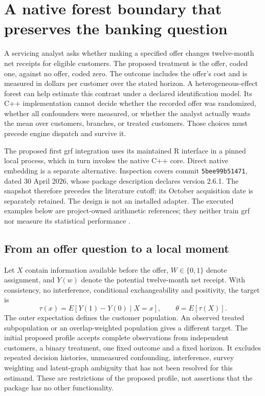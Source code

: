\section{A native forest boundary that preserves the banking question}
\label{exec13:grf-adapter}

A servicing analyst asks whether making a specified offer changes
twelve-month net receipts for eligible customers. The proposed treatment
is the offer, coded one, against no offer, coded zero. The outcome
includes the offer's cost and is measured in dollars per customer over
the stated horizon. A heterogeneous-effect forest can help estimate this
contrast under a declared identification model. Its C++ implementation
cannot decide whether the recorded offer was randomized, whether all
confounders were measured, or whether the analyst actually wants the
mean over customers, branches, or treated customers. Those choices must
precede engine dispatch and survive it.

The proposed first grf integration uses its maintained R interface in a
pinned local process, which in turn invokes the native C++ core. Direct
native embedding is a separate alternative. Inspection covers commit
\texttt{5bee99b51471}, dated 30 April 2026, whose package description
declares version 2.6.1. The snapshot therefore precedes the literature
cutoff; its October acquisition date is separately retained. The design
is not an installed adapter. The executed examples below are
project-owned arithmetic references; they neither train grf nor measure
its statistical performance
\citep{exec13_grf_runtime,exec13_grf_design,exec13_grf_oracle}.

\subsection{From an offer question to a local moment}

Let \(X\) contain information available before the offer,
\(W\in\{0,1\}\) denote assignment, and \(Y(w)\) denote the potential
twelve-month net receipt. With consistency, no interference, conditional
exchangeability and positivity, the target is \[
 \tau(x)=E[Y(1)-Y(0)\mid X=x],\qquad
 \theta=E[\tau(X)].
\] The outer expectation defines the customer population. An observed
treated subpopulation or an overlap-weighted population gives a
different target. The initial proposed profile accepts complete
observations from independent customers, a binary treatment, one fixed
outcome and a fixed horizon. It excludes repeated decision histories,
unmeasured confounding, interference, survey weighting and latent-graph
ambiguity that has not been resolved for this estimand. These are
restrictions of the proposed profile, not assertions that the package
has no other functionality.

